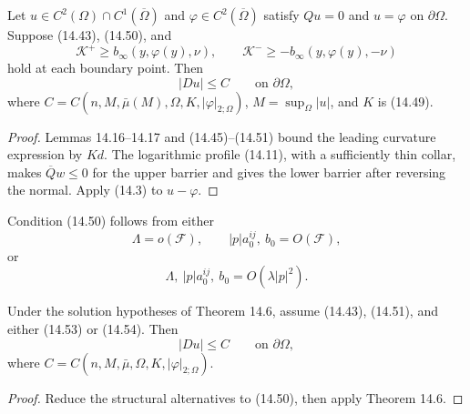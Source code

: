 \begin{theorem}
\label{gt14-boundary-gradient-14-6}
Let $u\in C^2(\Omega)\cap C^1(\overline\Omega)$ and
$\varphi\in C^2(\overline\Omega)$ satisfy $Qu=0$ and
$u=\varphi$ on $\partial\Omega$. Suppose (14.43), (14.50), and
\begin{equation}
\mathcal K^+\geq b_\infty(y,\varphi(y),\nu),\qquad
\mathcal K^-\geq-b_\infty(y,\varphi(y),-\nu)
\tag{14.51}
\end{equation}
hold at each boundary point. Then
\begin{equation}
|Du|\leq C\qquad\text{on }\partial\Omega,
\tag{14.52}
\end{equation}
where
$C=C(n,M,\bar\mu(M),\Omega,K,|\varphi|_{2;\Omega})$,
$M=\sup_\Omega|u|$, and $K$ is (14.49).
\end{theorem}
\begin{proof}
\sketch Lemmas 14.16--14.17 and (14.45)--(14.51) bound the leading
curvature expression by $Kd$. The logarithmic profile (14.11), with a sufficiently
thin collar, makes $\overline Qw\leq0$ for the upper barrier and gives the lower
barrier after reversing the normal. Apply (14.3) to $u-\varphi$.
\end{proof}

Condition (14.50) follows from either
\begin{equation}
\Lambda=o(\mathcal F),\qquad
|p|a_0^{ij},\ b_0=O(\mathcal F),
\tag{14.53}
\end{equation}
or
\begin{equation}
\Lambda,\ |p|a_0^{ij},\ b_0=O(\lambda|p|^2).
\tag{14.54}
\end{equation}

\begin{corollary}
\label{gt14-boundary-gradient-14-7}
Under the solution hypotheses of Theorem 14.6, assume (14.43), (14.51), and
either (14.53) or (14.54). Then
\begin{equation}
|Du|\leq C\qquad\text{on }\partial\Omega,
\tag{14.55}
\end{equation}
where $C=C(n,M,\bar\mu,\Omega,K,|\varphi|_{2;\Omega})$.
\end{corollary}
\begin{proof}
\sketch Reduce the structural alternatives to (14.50), then apply Theorem 14.6.
\end{proof}

